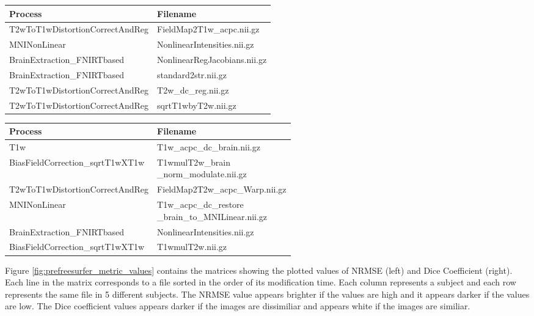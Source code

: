 \hfill \break
\begin{center}
\begin{tabular}{|l|l|}
\hline
\textbf{Process}      & \textbf{Filename} \\ \hline
T2wToT1wDistortionCorrectAndReg               & FieldMap2T1w\_acpc.nii.gz    \\ \hline
MNINonLinear             & NonlinearIntensities.nii.gz    \\ \hline
BrainExtraction\_FNIRTbased & NonlinearRegJacobians.nii.gz   \\ \hline
BrainExtraction\_FNIRTbased & standard2str.nii.gz \\ \hline
T2wToT1wDistortionCorrectAndReg & T2w\_dc\_reg.nii.gz \\ \hline
T2wToT1wDistortionCorrectAndReg & sqrtT1wbyT2w.nii.gz \\ \hline
\end{tabular}
\label{tab:PreFreeSurfer_NRMSE_processes}
\end{center}
\hfill \break

\hfill \break
\begin{center}
\begin{tabular}{|l|l|}
\hline
\textbf{Process}      & \textbf{Filename} \\ \hline
T1w              & T1w\_acpc\_dc\_brain.nii.gz    \\ \hline
BiasFieldCorrection\_sqrtT1wXT1w             & \makecell[l]{T1wmulT2w\_brain\\\_norm\_modulate.nii.gz}    \\ \hline
T2wToT1wDistortionCorrectAndReg & FieldMap2T2w\_acpc\_Warp.nii.gz   \\ \hline
MNINonLinear & \makecell[l]{T1w\_acpc\_dc\_restore\\\_brain\_to\_MNILinear.nii.gz} \\ \hline
BrainExtraction\_FNIRTbased & NonlinearIntensities.nii.gz \\ \hline
BiasFieldCorrection\_sqrtT1wXT1w & T1wmulT2w.nii.gz \\ \hline
\end{tabular}
\label{tab:PreFreeSurfer_NRMSE_processes}
\end{center}
\hfill \break

Figure \ref{fig:prefreesurfer_metric_values} contains the matrices showing the plotted values of NRMSE (left) and Dice Coefficient (right). Each line in the matrix corresponds to a file sorted in the order of its modification time. Each column represents a subject and each row represents the same file in 5 different subjects. The NRMSE value appears brighter if the values are high and it appears darker if the values are low. The Dice coefficient values appears darker if the images are dissimiliar and appears white if the images are similiar.

